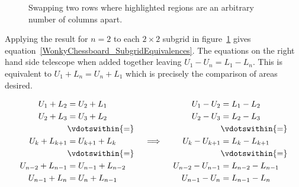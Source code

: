 \begin{figure}[H]
\begin{center}
	\end{center}
	\caption{Swapping two rows where highlighted regions are an arbitrary number of columns apart.}
	\label{fig:WonkyChessboard_Transpositions}
\end{figure}

Applying the result for $n = 2$ to each $2 \times 2$ subgrid in figure~\ref{fig:WonkyChessboard_Transpositions} gives equation~\eqref{WonkyChessboard_SubgridEquivalences}. The equations on the right hand side telescope when added together leaving $U_1 - U_n = L_1 - L_n$. This is equivalent to $U_1 + L_n = U_n + L_1$ which is precisely the comparison of areas desired.

\begin{equation}
	\begin{split}
		U_1 + L_2 &= U_2 + L_1 \\
		U_2 + L_3 &= U_3 + L_2 \\
		& \vdotswithin{=}\\
		U_k + L_{k+1} &= U_{k+1} + L_k \\
		& \vdotswithin{=} \\
		U_{n-2} + L_{n-1} &= U_{n-1} + L_{n-2} \\
		U_{n-1} + L_n &= U_n + L_{n-1}
	\end{split}
	\quad \implies \quad
	\begin{split}
		U_1 - U_2 &= L_1 - L_2 \\
		U_2 - U_3 &= L_2 - L_3 \\
		& \vdotswithin{=} \\
		U_k - U_{k+1} &= L_k - L_{k+1} \\
		& \vdotswithin{=} \\
		U_{n-2} - U_{n-1} &= L_{n-2} - L_{n-1} \\
		U_{n-1} - U_n &=  L_{n-1} - L_n
	\end{split}
	\label{WonkyChessboard_SubgridEquivalences}
\end{equation}

